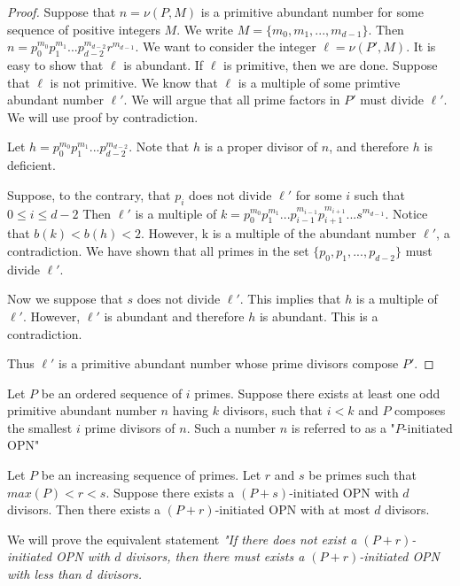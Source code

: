 \documentclass[../paper.tex]{subfiles}
\begin{document}
\begin{proof}
Suppose that $n = \nu(P,M)$ is a primitive abundant number for
some sequence of positive integers $M$. We write $M = \{ m_0,
m_1, ..., m_{d-1}\}$. Then $n = p_0^{m_0} p_1^{m_1} ... 
p_{d-2}^{m_{d-2}} r^{m_{d-1}}$. We want to consider the integer 
$\ell = \nu(P', M)$. It is easy to show that $\ell$ is abundant. 
If $\ell$ is primitive, then we are done. Suppose that $\ell$ is not
primitive. We know that $\ell$ is a multiple of some primtive
abundant number $\ell'$. We will argue that all prime factors in
$P'$ must divide $\ell'$. We will use proof by contradiction. 

Let $h = p_0^{m_0} p_1^{m_1} ... p_{d-2}^{m_{d-2}}$. Note that $h$
is a proper divisor of $n$, and therefore $h$ is deficient.

Suppose, to the contrary, that $p_i$ does not divide $\ell'$ for
some $i$ such that $0 \leq i \leq d - 2$
Then $\ell'$ is a multiple of $k = p_0^{m_0}
p_1^{m_1} ... p_{i-1}^{m_{i-1}} p_{i+1}^{m_{i+1}} ... 
s^{m_{d-1}}$. Notice that $b(k) < b(h) < 2$. However, k is a 
multiple of the abundant number $\ell'$, a contradiction. We have
shown that all primes in the set $\{p_0, p_1, ..., p_{d-2}\}$
must divide $\ell'$.  

Now we suppose that $s$ does not divide $\ell'$. This implies
that $h$ is a multiple of $\ell'$. However, $\ell'$ is abundant 
and therefore $h$ is abundant. This is a contradiction.

Thus $\ell'$ is a primitive abundant number whose prime divisors
compose $P'$.
\end{proof}


Let $P$ be an
ordered sequence of $i$ primes. Suppose there exists at least one
odd primitive abundant number $n$ having $k$ divisors, such that $i
< k$ and $P$ composes the smallest $i$ prime divisors of $n$.
Such a number $n$ is referred to as a "$P$-initiated OPN"

\begin{theorem}
\label{Divisibility}
Let $P$ be an increasing sequence of primes. Let $r$ and $s$ be
primes such that $max(P) < r < s$. Suppose there exists a $(P +
s)$-initiated OPN with $d$ divisors. Then there exists a $(P +
r)$-initiated OPN with at most $d$ divisors. 
\end{theorem}

We will prove the equivalent statement \textit{"If
there does not exist a $(P + r)$-initiated OPN with $d$ divisors,
then there must exists a $(P + r)$-initiated OPN with less than
$d$ divisors.}
\end{document}
